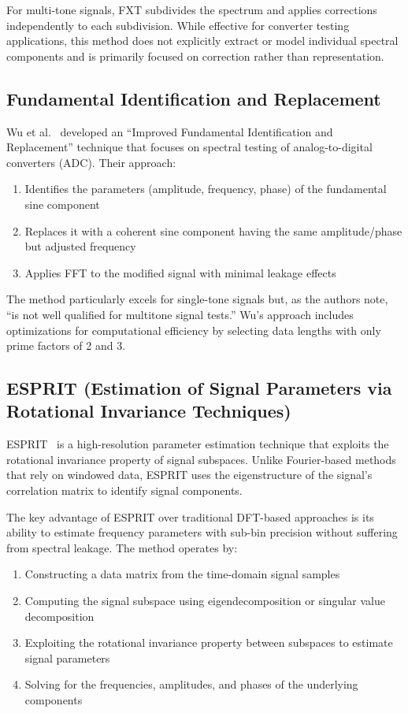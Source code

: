 \documentclass[11pt,twoside]{report}
\numberwithin{thm}{section}
\numberwithin{equation}{section}
\begin{document}
For multi-tone signals, FXT subdivides the spectrum and applies corrections independently to each subdivision. While effective for converter testing applications, this method does not explicitly extract or model individual spectral components and is primarily focused on correction rather than representation.

\subsection{Fundamental Identification and Replacement}

Wu et al.~\cite{wu2012new} developed an ``Improved Fundamental Identification and Replacement'' technique that focuses on spectral testing of analog-to-digital converters (ADC). Their approach:

\begin{enumerate}
    \item Identifies the parameters (amplitude, frequency, phase) of the fundamental sine component
    \item Replaces it with a coherent sine component having the same amplitude/phase but adjusted frequency
    \item Applies FFT to the modified signal with minimal leakage effects
\end{enumerate}

The method particularly excels for single-tone signals but, as the authors note, ``is not well qualified for multitone signal tests.'' Wu's approach includes optimizations for computational efficiency by selecting data lengths with only prime factors of 2 and 3.

\subsection{ESPRIT (Estimation of Signal Parameters via Rotational Invariance Techniques)}

ESPRIT~\cite{roy1989esprit} is a high-resolution parameter estimation technique that exploits the rotational invariance property of signal subspaces. Unlike Fourier-based methods that rely on windowed data, ESPRIT uses the eigenstructure of the signal's correlation matrix to identify signal components.

The key advantage of ESPRIT over traditional DFT-based approaches is its ability to estimate frequency parameters with sub-bin precision without suffering from spectral leakage. The method operates by:

\begin{enumerate}
    \item Constructing a data matrix from the time-domain signal samples
    \item Computing the signal subspace using eigendecomposition or singular value decomposition 
    \item Exploiting the rotational invariance property between subspaces to estimate signal parameters
    \item Solving for the frequencies, amplitudes, and phases of the underlying components
\end{enumerate}
\end{document}
